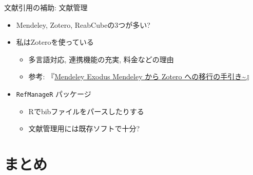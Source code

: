 \documentclass[14pt,ignorenonframetext,]{beamer}
\providecommand{\tightlist}{%
  \setlength{\itemsep}{0pt}\setlength{\parskip}{0pt}}
\begin{document}
\begin{frame}[fragile]{文献引用の補助: 文献管理}
\protect\hypertarget{ux6587ux732eux5f15ux7528ux306eux88dcux52a9-ux6587ux732eux7ba1ux7406}{}

\begin{itemize}
\tightlist
\item
  Mendeley, Zotero, ReabCubeの3つが多い?
\item
  私はZoteroを使っている

  \begin{itemize}
  \tightlist
  \item
    多言語対応, 連携機能の充実, 料金などの理由
  \item
    参考:
    『\href{https://ill-identified.hatenablog.com/entry/2019/03/05/195257}{Mendeley
    Exodus Mendeley から Zotero への移行の手引き\textasciitilde{}}』
  \end{itemize}
\item
  \texttt{RefManageR} パッケージ

  \begin{itemize}
  \tightlist
  \item
    Rでbibファイルをパースしたりする
  \item
    文献管理用には既存ソフトで十分?
  \end{itemize}
\end{itemize}

\end{frame}

\hypertarget{ux307eux3068ux3081}{%
\section{まとめ}\label{ux307eux3068ux3081}}
\end{document}
